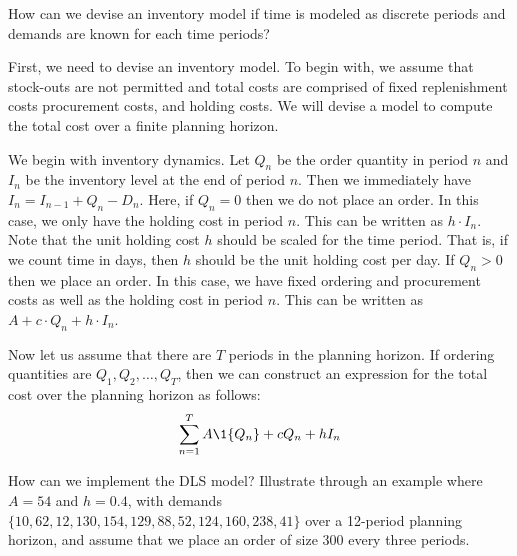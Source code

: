 \begin{question}
How can we devise an inventory model if time is modeled as discrete periods and demands are known for each time periods?
\end{question}

\begin{solution}
First, we need to devise an inventory model. To begin with, we assume that stock-outs are not permitted and total costs are comprised of fixed replenishment costs procurement costs, and holding costs. We will devise a model to compute the total cost over a finite planning horizon.

We begin with inventory dynamics. Let $Q_n$ be the order quantity in period $n$ and $I_n$ be the inventory level at the end of period $n$. Then we immediately have $I_n=I_{n-1}+Q_n-D_n$. Here, if $Q_n=0$ then we do not place an order. In this case, we only have the holding cost in period $n$. This can be written as $h\cdot I_n$. Note that the unit holding cost $h$ should be scaled for the time period. That is, if we count time in days, then $h$ should be the unit holding cost per day. If $Q_n>0$ then we place an order. In this case, we have fixed ordering and procurement costs as well as the holding cost in period $n$. This can be written as $A+c\cdot Q_n+h\cdot I_n$.

Now let us assume that there are $T$ periods in the planning horizon. If ordering quantities are $Q_1,Q_2,\ldots,Q_T$, then we can construct an expression for the total cost over the planning horizon as follows:
\begin{align*}
\sum_{n=1}^T A \1{Q_n} + c Q_n + hI_n
\end{align*}
\end{solution}

\begin{question}
How can we implement the DLS model? Illustrate through an example where $A=54$ and $h=0.4$, with demands $\{10,62,12,130,154,129,88,52,124,160,238,41\}$ over a 12-period planning horizon, and assume that we place an order of size 300 every three periods. 
\end{question}

